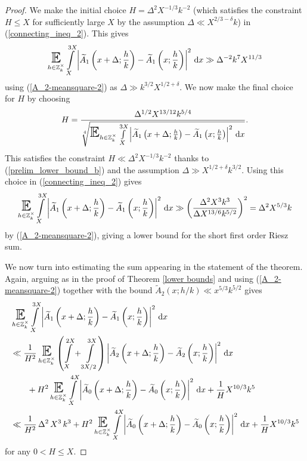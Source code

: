 \documentclass[a4paper,10pt,twoside]{amsart}
\theoremstyle{definition}
\numberwithin{equation}{section}
\newcommand\E{\mathbb{E}}
\renewcommand\:{\colon}
\begin{document}
\begin{proof}
We make the initial choice $H=\Delta^2X^{-1/3}k^{-2}$ (which satisfies the constraint $H\leq X$ for sufficiently large $X$ by the assumption $\Delta\ll X^{2/3-\delta}k$) in (\ref{connecting_ineq_2}). This gives
\begin{align}\label{prelim_lower_bound_b}
\mathop{\text{\LARGE$\E$}}_{h\in\mathbb Z_k^\times}\int\limits_X^{3X}\left|\widetilde A_1\left(x+\Delta;\frac hk\right)-\widetilde A_1\left(x;\frac hk\right)\right|^2\,\mathrm dx\gg \Delta^{-2}k^7X^{11/3}
\end{align}
using (\ref{A_2-meansquare-2}) as $\Delta\gg k^{3/2}X^{1/2+\delta}$. We now make the final choice for $H$ by choosing
\[ 
H=\frac{\Delta^{1/2}X^{13/12}k^{5/4}}{\sqrt[4]{\mathop{\text{\LARGE$\E$}}_{h\in\mathbb Z_k^\times}\int\limits_X^{3X}\left|\widetilde A_1\left(x+\Delta;\frac hk\right)-\widetilde A_1\left(x;\frac hk\right)\right|^2\,\mathrm dx}}.
\]
This satisfies the constraint $H\ll \Delta^2X^{-1/3}k^{-2}$ thanks to (\ref{prelim_lower_bound_b}) and the assumption $\Delta\gg X^{1/2+\delta}k^{3/2}$. Using this choice in (\ref{connecting_ineq_2}) gives
\begin{align}\label{prelim_lower_bound_29}
\mathop{\text{\LARGE$\E$}}_{h\in\mathbb Z_k^\times}\int\limits_X^{3X}\left|\widetilde A_1\left(x+\Delta;\frac hk\right)-\widetilde A_1\left(x;\frac hk\right)\right|^2\,\mathrm dx\gg\left(\frac{\Delta^2X^3k^3}{\Delta X^{13/6}k^{5/2}}\right)^2=\Delta^2X^{5/3}k
\end{align}
by (\ref{A_2-meansquare-2}), giving a lower bound for the short first order Riesz sum.

We now turn into estimating the sum appearing in the statement of the theorem. Again, arguing as in the proof of Theorem \ref{lower bounds} and using (\ref{A_2-meansquare-2}) together with the bound $\widetilde A_2(x;h/k)\ll x^{5/3}k^{5/2}$ gives
\begin{align}\label{connecting_ineq_3}
&\mathop{\text{\LARGE$\E$}}_{h\in\mathbb Z_k^\times}\int\limits_X^{3X}\left|\widetilde A_1\left(x+\Delta;\frac hk\right)-\widetilde A_1\left(x;\frac hk\right)\right|^2\,\mathrm dx \nonumber\\
&\ll\frac1{H^2}\mathop{\text{\LARGE$\E$}}_{h\in\mathbb Z_k^\times}\left(\int\limits_X^{2X}+\int\limits_{3X/2}^{3X}\right)\left|\widetilde A_2\left(x+\Delta;\frac hk\right)-\widetilde A_2\left(x;\frac hk\right)\right|^2\,\mathrm dx \nonumber \\
&\qquad+H^2\mathop{\text{\LARGE$\E$}}_{h\in\mathbb Z_k^\times}\int\limits_X^{4X}\left|\widetilde A_0\left(x+\Delta;\frac hk\right)-\widetilde A_0\left(x;\frac hk\right)\right|^2\,\mathrm dx+\frac1H X^{10/3}k^5 \nonumber\\
&\ll\frac1{H^2}\,\Delta^2\,X^3\,k^3+H^2\mathop{\text{\LARGE$\E$}}_{h\in\mathbb Z_k^\times}\int\limits_X^{4X}\left|\widetilde A_0\left(x+\Delta;\frac hk\right)-\widetilde A_0\left(x;\frac hk\right)\right|^2\,\mathrm dx+\frac1H X^{10/3}k^5
\end{align}
for any $0<H\leq X$.


\end{proof}
\end{document}
